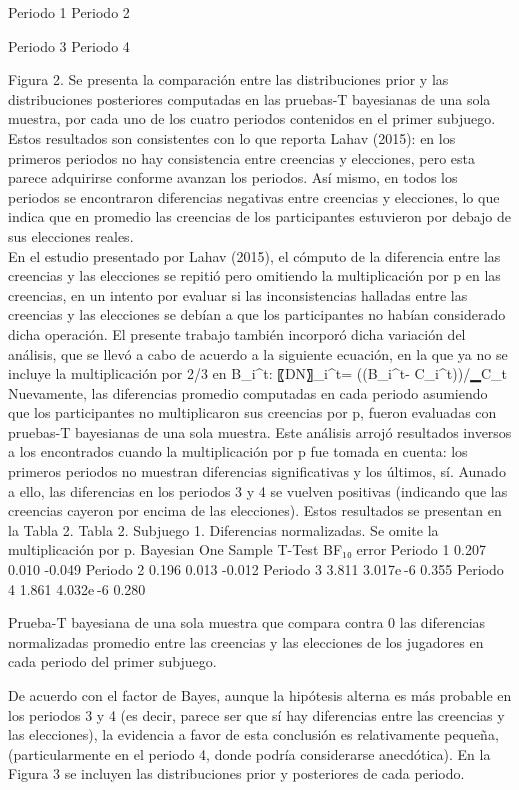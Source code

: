 Periodo 1				Periodo 2
  
Periodo 3				Periodo 4

Figura 2. Se presenta la comparación entre las distribuciones prior y las distribuciones posteriores computadas en las pruebas-T bayesianas de una sola muestra, por cada uno de los cuatro periodos contenidos en el primer subjuego.
Estos resultados son consistentes con lo que reporta Lahav (2015): en los primeros periodos no hay consistencia entre creencias y elecciones, pero esta parece adquirirse conforme avanzan los periodos. Así mismo, en todos los periodos se encontraron diferencias negativas entre creencias y elecciones, lo que indica que en promedio las creencias de los participantes estuvieron por debajo de sus elecciones reales.\\

En el estudio presentado por Lahav (2015), el cómputo de la diferencia entre las creencias y las elecciones se repitió pero omitiendo la multiplicación por p en las creencias, en un intento por evaluar si las inconsistencias halladas entre las creencias y las elecciones se debían a que los participantes no habían considerado dicha operación. El presente trabajo también incorporó dicha variación del análisis, que se llevó a cabo de acuerdo a la siguiente ecuación, en la que ya no se incluye la multiplicación por 2/3 en B_i^t:
〖DN〗_i^t=  ((B_i^t- C_i^t))/▁C_t 
Nuevamente, las diferencias promedio computadas en cada periodo asumiendo que los participantes no multiplicaron sus creencias por p, fueron evaluadas con pruebas-T bayesianas de una sola muestra.  Este análisis arrojó resultados inversos a los encontrados cuando la multiplicación por p fue tomada en cuenta: los primeros periodos no muestran diferencias significativas y los últimos, sí.  Aunado a ello, las diferencias en los periodos 3 y 4 se vuelven positivas (indicando que las creencias cayeron por encima de las elecciones). Estos resultados se presentan en la Tabla 2.
Tabla 2. Subjuego 1. Diferencias normalizadas. Se omite la multiplicación por p.
Bayesian One Sample T-Test 	
  	BF₁₀ 	error %
Periodo 1 		0.207 		0.010 		-0.049 
Periodo 2 		0.196 		0.013 		-0.012 
Periodo 3 		3.811 		3.017e -6 		0.355 
Periodo 4 		1.861 		4.032e -6 		0.280 
	
Prueba-T bayesiana de una sola muestra que compara contra 0 las diferencias normalizadas promedio entre las creencias y las elecciones de los jugadores en cada periodo del primer subjuego.

De acuerdo con el factor de Bayes, aunque la hipótesis alterna es más probable en los periodos 3 y 4 (es decir, parece ser que sí hay diferencias entre las creencias y las elecciones), la evidencia a favor de esta conclusión es relativamente pequeña, (particularmente en el periodo 4, donde podría considerarse anecdótica). En la Figura 3 se incluyen las distribuciones prior y posteriores de cada periodo.


